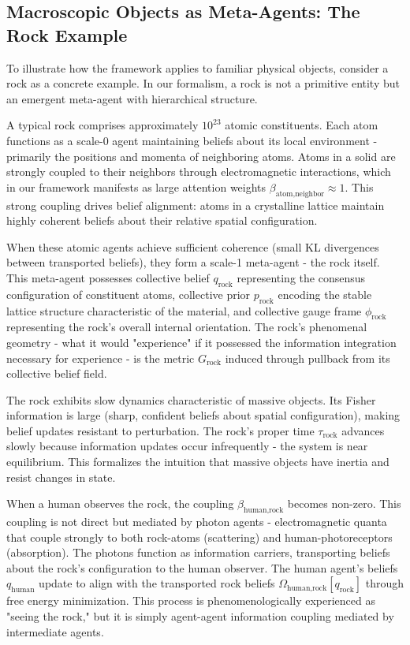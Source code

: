 \documentclass[11pt]{article}
\begin{document}
\subsection{Macroscopic Objects as Meta-Agents: The Rock Example}

To illustrate how the framework applies to familiar physical objects, consider a rock as a concrete example. In our formalism, a rock is not a primitive entity but an emergent meta-agent with hierarchical structure.

A typical rock comprises approximately $10^{23}$ atomic constituents. Each atom functions as a scale-0 agent maintaining beliefs about its local environment - primarily the positions and momenta of neighboring atoms. Atoms in a solid are strongly coupled to their neighbors through electromagnetic interactions, which in our framework manifests as large attention weights $\beta_{\text{atom,neighbor}} \approx 1$. This strong coupling drives belief alignment: atoms in a crystalline lattice maintain highly coherent beliefs about their relative spatial configuration.

When these atomic agents achieve sufficient coherence (small KL divergences between transported beliefs), they form a scale-1 meta-agent - the rock itself. This meta-agent possesses collective belief $q_{\text{rock}}$ representing the consensus configuration of constituent atoms, collective prior $p_{\text{rock}}$ encoding the stable lattice structure characteristic of the material, and collective gauge frame $\phi_{\text{rock}}$ representing the rock's overall internal orientation. The rock's phenomenal geometry - what it would "experience" if it possessed the information integration necessary for experience - is the metric $G_{\text{rock}}$ induced through pullback from its collective belief field.

The rock exhibits slow dynamics characteristic of massive objects. Its Fisher information is large (sharp, confident beliefs about spatial configuration), making belief updates resistant to perturbation. The rock's proper time $\tau_{\text{rock}}$ advances slowly because information updates occur infrequently - the system is near equilibrium. This formalizes the intuition that massive objects have inertia and resist changes in state.

When a human observes the rock, the coupling $\beta_{\text{human,rock}}$ becomes non-zero. This coupling is not direct but mediated by photon agents - electromagnetic quanta that couple strongly to both rock-atoms (scattering) and human-photoreceptors (absorption). The photons function as information carriers, transporting beliefs about the rock's configuration to the human observer. The human agent's beliefs $q_{\text{human}}$ update to align with the transported rock beliefs $\Omega_{\text{human,rock}}[q_{\text{rock}}]$ through free energy minimization. This process is phenomenologically experienced as "seeing the rock," but it is simply agent-agent information coupling mediated by intermediate agents.
\end{document}
